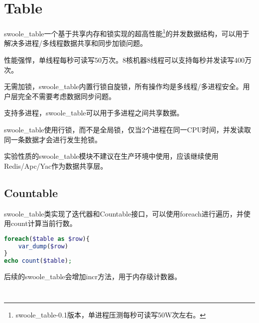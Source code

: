 \begin{lstlisting}[language=PHP]

\end{lstlisting}



\chapter{Table}


swoole\_table一个基于共享内存和锁实现的超高性能\footnote{swoole_table-0.1版本，单进程压测每秒可读写50W次左右。}的并发数据结构，可以用于解决多进程/多线程数据共享和同步加锁问题。


\begin{compactitem}
\item 性能强悍，单线程每秒可读写50万次。8核机器8线程可以支持每秒并发读写400万次。
\item 无需加锁，swoole\_table内置行锁自旋锁，所有操作均是多线程/多进程安全。用户层完全不需要考虑数据同步问题。
\item 支持多进程，swoole\_table可以用于多进程之间共享数据。
\end{compactitem}

swoole\_table使用行锁，而不是全局锁，仅当2个进程在同一CPU时间，并发读取同一条数据才会进行发生抢锁。

实验性质的swoole\_table模块不建议在生产环境中使用，应该继续使用Redis/Apc/Yac作为数据共享层。

\section{Countable}

swoole_table类实现了迭代器和Countable接口，可以使用foreach进行遍历，并使用count计算当前行数。

\begin{lstlisting}[language=PHP]
foreach($table as $row){
	var_dump($row)
}
echo count($table);
\end{lstlisting}


后续的swoole\_table会增加incr方法，用于内存级计数器。




\begin{lstlisting}[language=PHP]

\end{lstlisting}




\begin{lstlisting}[language=PHP]

\end{lstlisting}




